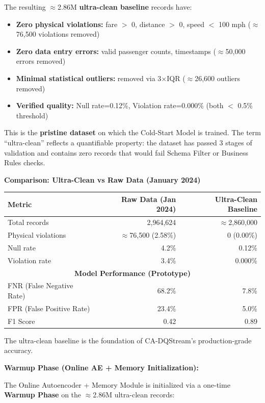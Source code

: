 The resulting $\approx$2.86M \textbf{ultra-clean baseline} records have:
\begin{itemize}
    \item \textbf{Zero physical violations:} fare $>$ 0, distance $>$ 0, speed $<$ 100 mph ($\approx$76,500 violations removed)
    \item \textbf{Zero data entry errors:} valid passenger counts, timestamps ($\approx$50,000 errors removed)
    \item \textbf{Minimal statistical outliers:} removed via 3$\times$IQR ($\approx$26,600 outliers removed)
    \item \textbf{Verified quality:} Null rate=0.12\%, Violation rate=0.000\% (both $<$ 0.5\% threshold)
\end{itemize}

This is the \textbf{pristine dataset} on which the Cold-Start Model is trained. The term ``ultra-clean'' reflects a quantifiable property: the dataset has passed 3 stages of validation and contains zero records that would fail Schema Filter or Business Rules checks.

\textbf{Comparison: Ultra-Clean vs Raw Data (January 2024)}

\begin{center}
\begin{tabular}{|l|r|r|}
\hline
\textbf{Metric} & \textbf{Raw Data (Jan 2024)} & \textbf{Ultra-Clean Baseline} \\
\hline
Total records & 2,964,624 & $\approx$2,860,000 \\
Physical violations & $\approx$76,500 (2.58\%) & 0 (0.00\%) \\
Null rate & 4.2\% & 0.12\% \\
Violation rate & 3.4\% & 0.000\% \\
\hline
\multicolumn{3}{|c|}{\textbf{Model Performance (Prototype)}} \\
\hline
FNR (False Negative Rate) & 68.2\% & 7.8\% \\
FPR (False Positive Rate) & 23.4\% & 5.0\% \\
F1 Score & 0.42 & 0.89 \\
\hline
\end{tabular}
\end{center}

The ultra-clean baseline is the foundation of CA-DQStream's production-grade accuracy.

\textbf{Warmup Phase (Online AE + Memory Initialization):}

The Online Autoencoder + Memory Module is initialized via a one-time \textbf{Warmup Phase} on the $\approx$2.86M ultra-clean records:

